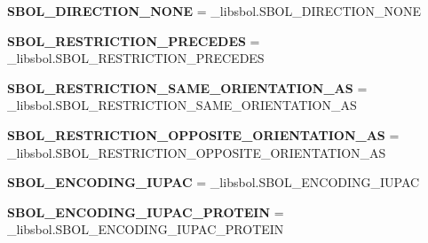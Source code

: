 \begin{DoxyCompactItemize}
\item 
{\bfseries S\+B\+O\+L\+\_\+\+D\+I\+R\+E\+C\+T\+I\+O\+N\+\_\+\+N\+O\+NE} = \+\_\+libsbol.\+S\+B\+O\+L\+\_\+\+D\+I\+R\+E\+C\+T\+I\+O\+N\+\_\+\+N\+O\+NE\hypertarget{namespacesbol_1_1libsbol_ab8fb0523e38a8191f079546b8b86e992}{}\label{namespacesbol_1_1libsbol_ab8fb0523e38a8191f079546b8b86e992}

\item 
{\bfseries S\+B\+O\+L\+\_\+\+R\+E\+S\+T\+R\+I\+C\+T\+I\+O\+N\+\_\+\+P\+R\+E\+C\+E\+D\+ES} = \+\_\+libsbol.\+S\+B\+O\+L\+\_\+\+R\+E\+S\+T\+R\+I\+C\+T\+I\+O\+N\+\_\+\+P\+R\+E\+C\+E\+D\+ES\hypertarget{namespacesbol_1_1libsbol_a34a179c5ea27ee31c5c0a46d9b68bae7}{}\label{namespacesbol_1_1libsbol_a34a179c5ea27ee31c5c0a46d9b68bae7}

\item 
{\bfseries S\+B\+O\+L\+\_\+\+R\+E\+S\+T\+R\+I\+C\+T\+I\+O\+N\+\_\+\+S\+A\+M\+E\+\_\+\+O\+R\+I\+E\+N\+T\+A\+T\+I\+O\+N\+\_\+\+AS} = \+\_\+libsbol.\+S\+B\+O\+L\+\_\+\+R\+E\+S\+T\+R\+I\+C\+T\+I\+O\+N\+\_\+\+S\+A\+M\+E\+\_\+\+O\+R\+I\+E\+N\+T\+A\+T\+I\+O\+N\+\_\+\+AS\hypertarget{namespacesbol_1_1libsbol_a2c224612b10170ed02038565f2763f03}{}\label{namespacesbol_1_1libsbol_a2c224612b10170ed02038565f2763f03}

\item 
{\bfseries S\+B\+O\+L\+\_\+\+R\+E\+S\+T\+R\+I\+C\+T\+I\+O\+N\+\_\+\+O\+P\+P\+O\+S\+I\+T\+E\+\_\+\+O\+R\+I\+E\+N\+T\+A\+T\+I\+O\+N\+\_\+\+AS} = \+\_\+libsbol.\+S\+B\+O\+L\+\_\+\+R\+E\+S\+T\+R\+I\+C\+T\+I\+O\+N\+\_\+\+O\+P\+P\+O\+S\+I\+T\+E\+\_\+\+O\+R\+I\+E\+N\+T\+A\+T\+I\+O\+N\+\_\+\+AS\hypertarget{namespacesbol_1_1libsbol_af849e208e2fa5f59830cbef0e89c6ca5}{}\label{namespacesbol_1_1libsbol_af849e208e2fa5f59830cbef0e89c6ca5}

\item 
{\bfseries S\+B\+O\+L\+\_\+\+E\+N\+C\+O\+D\+I\+N\+G\+\_\+\+I\+U\+P\+AC} = \+\_\+libsbol.\+S\+B\+O\+L\+\_\+\+E\+N\+C\+O\+D\+I\+N\+G\+\_\+\+I\+U\+P\+AC\hypertarget{namespacesbol_1_1libsbol_a0d3f51d2b85581e6787d3318627c95db}{}\label{namespacesbol_1_1libsbol_a0d3f51d2b85581e6787d3318627c95db}

\item 
{\bfseries S\+B\+O\+L\+\_\+\+E\+N\+C\+O\+D\+I\+N\+G\+\_\+\+I\+U\+P\+A\+C\+\_\+\+P\+R\+O\+T\+E\+IN} = \+\_\+libsbol.\+S\+B\+O\+L\+\_\+\+E\+N\+C\+O\+D\+I\+N\+G\+\_\+\+I\+U\+P\+A\+C\+\_\+\+P\+R\+O\+T\+E\+IN\hypertarget{namespacesbol_1_1libsbol_aa039bd1417660d95cc16b63d65109355}{}\label{namespacesbol_1_1libsbol_aa039bd1417660d95cc16b63d65109355}


\end{DoxyCompactItemize}

